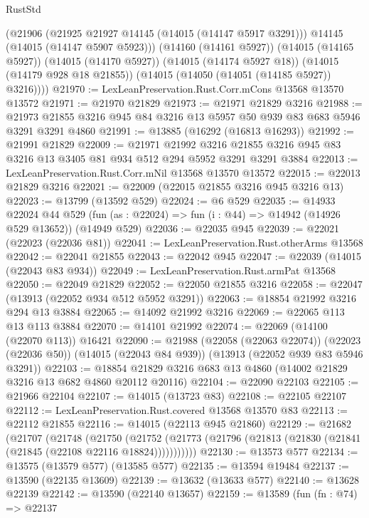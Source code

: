 \begin{lexlean}{RustStd}
\begin{coremodule}
        (@21906
          (@21925 @21927 @14145 (@14015 (@14147 @5917 @3291)))
          @14145
          (@14015 (@14147 @5907 @5923)))
        (@14160 (@14161 @5927))
        (@14015 (@14165 @5927))
        (@14015 (@14170 @5927))
        (@14015 (@14174 @5927 @18))
        (@14015 (@14179 @928 @18 @21855))
        (@14015 (@14050 (@14051 (@14185 @5927)) @3216))))
@21970 := LexLeanPreservation.Rust.Corr.mCons @13568 @13570 @13572
@21971 := @21970 @21829
@21973 := @21971 @21829 @3216
@21988 := @21973 @21855 @3216 @945 @84 @3216 @13 @5957 @50 @939 @83 @683 @5946 @3291 @3291 @4860
@21991 := @13885 (@16292 (@16813 @16293))
@21992 := @21991 @21829
@22009 := @21971
    @21992
    @3216
    @21855
    @3216
    @945
    @83
    @3216
    @13
    @3405
    @81
    @934
    @512
    @294
    @5952
    @3291
    @3291
    @3884
@22013 := LexLeanPreservation.Rust.Corr.mNil @13568 @13570 @13572
@22015 := @22013 @21829 @3216
@22021 := @22009 (@22015 @21855 @3216 @945 @3216 @13)
@22023 := @13799 (@13592 @529)
@22024 := @6 @529
@22035 := @14933
    @22024
    @44
    @529
    (fun (as : @22024) => fun (i : @44) => @14942 (@14926 @529 @13652))
    (@14949 @529)
@22036 := @22035 @945
@22039 := @22021 (@22023 (@22036 @81))
@22041 := LexLeanPreservation.Rust.otherArms @13568
@22042 := @22041 @21855
@22043 := @22042 @945
@22047 := @22039 (@14015 (@22043 @83 @934))
@22049 := LexLeanPreservation.Rust.armPat @13568
@22050 := @22049 @21829
@22052 := @22050 @21855 @3216
@22058 := @22047 (@13913 (@22052 @934 @512 @5952 @3291))
@22063 := @18854 @21992 @3216 @294 @13 @3884
@22065 := @14092 @21992 @3216
@22069 := @22065 @113 @13 @113 @3884
@22070 := @14101 @21992
@22074 := @22069 (@14100 (@22070 @113)) @16421
@22090 := @21988
    (@22058 (@22063 @22074))
    (@22023 (@22036 @50))
    (@14015 (@22043 @84 @939))
    (@13913 (@22052 @939 @83 @5946 @3291))
@22103 := @18854 @21829 @3216 @683 @13 @4860 (@14002 @21829 @3216 @13 @682 @4860 @20112 @20116)
@22104 := @22090 @22103
@22105 := @21966 @22104
@22107 := @14015 (@13723 @83)
@22108 := @22105 @22107
@22112 := LexLeanPreservation.Rust.covered @13568 @13570 @83
@22113 := @22112 @21855
@22116 := @14015 (@22113 @945 @21860)
@22129 := @21682
    (@21707
      (@21748
        (@21750
          (@21752 (@21773 (@21796 (@21813 (@21830 (@21841 (@21845 (@22108 @22116 @18824)))))))))))
@22130 := @13573 @577
@22134 := @13575 (@13579 @577) (@13585 @577)
@22135 := @13594 @19484
@22137 := @13590 (@22135 @13609)
@22139 := @13632 (@13633 @577)
@22140 := @13628 @22139
@22142 := @13590 (@22140 @13657)
@22159 := @13589
    (fun (fn : @74) =>
    @22137

\end{coremodule}
\end{lexlean}
